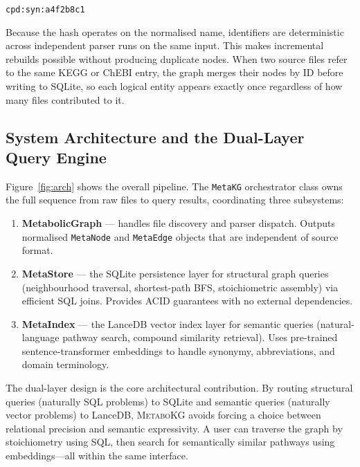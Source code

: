 \documentclass[10pt]{article}
\begin{document}
\begin{center}
\texttt{cpd:syn:a4f2b8c1}
\end{center}

Because the hash operates on the normalised name, identifiers are
deterministic across independent parser runs on the same input. This makes
incremental rebuilds possible without producing duplicate nodes. When two
source files refer to the same KEGG or ChEBI entry, the graph merges their
nodes by ID before writing to SQLite, so each logical entity appears exactly
once regardless of how many files contributed to it.

\subsection{System Architecture and the Dual-Layer Query Engine}

Figure~\ref{fig:arch} shows the overall pipeline. The \texttt{MetaKG}
orchestrator class owns the full sequence from raw files to query results,
coordinating three subsystems:

\begin{enumerate}[leftmargin=*]
  \item \textbf{MetabolicGraph} --- handles file discovery and parser
    dispatch. Outputs normalised \texttt{MetaNode} and \texttt{MetaEdge}
    objects that are independent of source format.
  \item \textbf{MetaStore} --- the SQLite persistence layer for structural
    graph queries (neighbourhood traversal, shortest-path BFS, stoichiometric
    assembly) via efficient SQL joins. Provides ACID guarantees with no
    external dependencies.
  \item \textbf{MetaIndex} --- the LanceDB vector index layer for semantic
    queries (natural-language pathway search, compound similarity retrieval).
    Uses pre-trained sentence-transformer embeddings to handle synonymy,
    abbreviations, and domain terminology.
\end{enumerate}

The dual-layer design is the core architectural contribution. By routing
structural queries (naturally SQL problems) to SQLite and semantic queries
(naturally vector problems) to LanceDB, \textsc{MetaboKG} avoids forcing a
choice between relational precision and semantic expressivity. A user can
traverse the graph by stoichiometry using SQL, then search for semantically
similar pathways using embeddings---all within the same interface.
\end{document}
